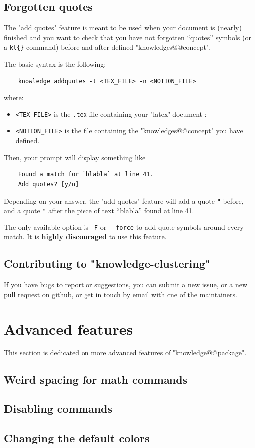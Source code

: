 \documentclass{article}
\begin{document}
\subsection{Forgotten quotes}


The "add quotes" feature is meant to be used when your document is (nearly)
finished and you want to check that you have not forgotten ``quotes'' symbols
(or a \verb|kl{}| command) before and after defined "knowledges@@concept".

The basic syntax is the following:
\begin{verbatim}
    knowledge addquotes -t <TEX_FILE> -n <NOTION_FILE> 
\end{verbatim}
where:
\begin{itemize}
    \item \texttt{<TEX\_FILE>} is the \verb|.tex| file containing your "latex"
    document :
    \item \texttt{<NOTION\_FILE>} is the file containing the
    "knowledges@@concept" you have defined.
\end{itemize}
Then, your prompt will display something like
\begin{verbatim}
    Found a match for `blabla` at line 41.
    Add quotes? [y/n]
\end{verbatim}
Depending on your answer, the "add quotes" feature will add a quote
%
\verb|"| before, and a quote \verb|"| after 
%
the piece of text ``blabla'' found at line 41.

The only available option is \verb|-F| or \verb|--force| to add
quote symbols around every match. It is \textbf{highly discouraged}
to use this feature. 

\subsection{Contributing to "knowledge-clustering"}

If you have bugs to report or suggestions, you can submit a
\href{https://github.com/remimorvan/knowledge-clustering/issues}{new issue},
or a new pull request on github, or get in touch by email with
one of the maintainers.


\section{Advanced features}

This section is dedicated on more advanced features of "knowledge@@package".

\subsection{Weird spacing for math commands}

\subsection{Disabling commands}

\subsection{Changing the default colors}
\end{document}
